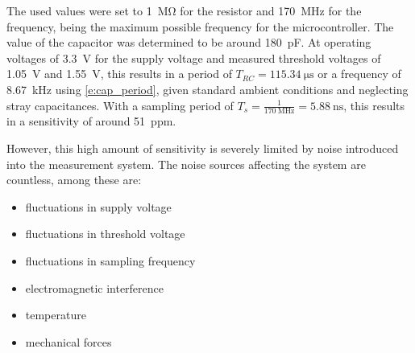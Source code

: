 The used values were set to  \qty{1}{\mega\ohm} for the resistor and \qty{170}{\mega\Hz} for the frequency, being the maximum possible frequency for the microcontroller. The value of the capacitor was determined to be around \qty{180}{\pico\F}. At operating voltages of \qty{3.3}{\volt} for the supply voltage and measured threshold voltages of \qty{1.05}{\volt} and \qty{1.55}{\volt}, this results in a period of $T_{RC} = \qty{115.34}{\us}$ or a frequency of \qty{8.67}{\kilo\Hz} using \cref{e:cap_period}, given standard ambient conditions and neglecting stray capacitances. With a sampling period of $T_{s} = \frac{1}{\qty{170}{\mega\Hz}} = \qty{5.88}{\ns}$, this results in a sensitivity of around \qty{51}{ppm}. 

However, this high amount of sensitivity is severely limited by noise introduced into the measurement system. The noise sources affecting the system are countless, among these are:
\begin{itemize}
    \item fluctuations in supply voltage
    \item fluctuations in threshold voltage
    \item fluctuations in sampling frequency
    \item electromagnetic interference
    \item temperature
    \item mechanical forces
\end{itemize}

